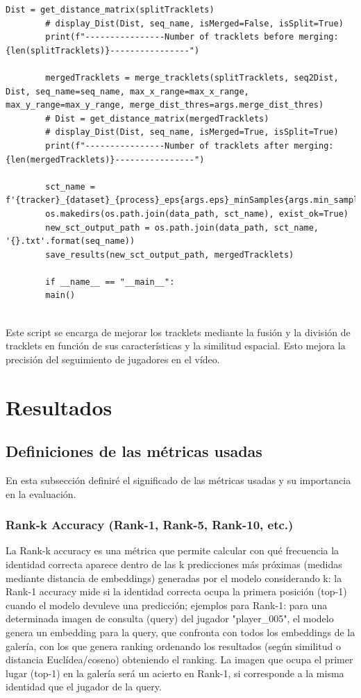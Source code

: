 \documentclass[12pt, a4paper, twoside]{article}
\begin{document}
\begin{lstlisting}[style=pythonstyle]
		Dist = get_distance_matrix(splitTracklets)
		# display_Dist(Dist, seq_name, isMerged=False, isSplit=True)
		print(f"----------------Number of tracklets before merging: {len(splitTracklets)}----------------")
		
		mergedTracklets = merge_tracklets(splitTracklets, seq2Dist, Dist, seq_name=seq_name, max_x_range=max_x_range, max_y_range=max_y_range, merge_dist_thres=args.merge_dist_thres)
		# Dist = get_distance_matrix(mergedTracklets)
		# display_Dist(Dist, seq_name, isMerged=True, isSplit=True)
		print(f"----------------Number of tracklets after merging: {len(mergedTracklets)}----------------")
		
		sct_name = f'{tracker}_{dataset}_{process}_eps{args.eps}_minSamples{args.min_samples}_K{args.max_k}_mergeDist{args.merge_dist_thres}_spatial{args.spatial_factor}'
		os.makedirs(os.path.join(data_path, sct_name), exist_ok=True)
		new_sct_output_path = os.path.join(data_path, sct_name, '{}.txt'.format(seq_name))
		save_results(new_sct_output_path, mergedTracklets)
		
		if __name__ == "__main__":
		main()
		
	\end{lstlisting}
	
	Este script se encarga de mejorar los tracklets mediante la fusión y la división de tracklets en función de sus características y la similitud espacial. Esto mejora la precisión del seguimiento de jugadores en el vídeo.
	
	
	
	\section{Resultados}
	
	\subsection{Definiciones de las métricas usadas}
	
	En esta subsección definiré el significado de las métricas usadas y su importancia en la evaluación.
	
	\subsubsection{Rank-k Accuracy (Rank-1, Rank-5, Rank-10, etc.)}
	
	La Rank-k accuracy es una métrica que permite calcular con qué frecuencia la identidad correcta aparece dentro de las k predicciones más próximas (medidas mediante distancia de embeddings) generadas por el modelo considerando k: la Rank-1 accuracy mide si la identidad correcta ocupa la primera posición (top-1) cuando el modelo devuleve una predicción; ejemplos para Rank-1: para una determinada imagen de consulta (query) del jugador "player\_005", el modelo genera un embedding para la query, que confronta con todos los embeddings de la galería, con los que genera ranking ordenando los resultados (según similitud o distancia Euclídea/coseno) obteniendo el ranking. La imagen que ocupa el primer lugar (top-1) en la galería será un acierto en Rank-1, si corresponde a la misma identidad que el jugador de la query.
	
\end{document}
